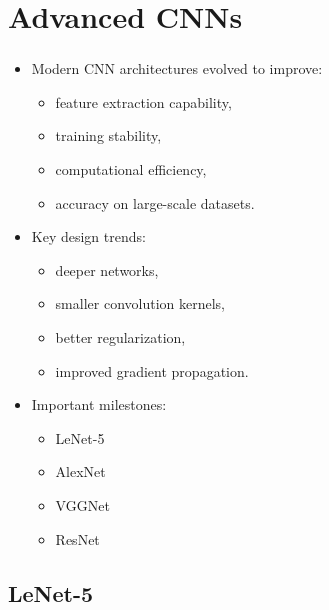 \documentclass[xcolor=table]{beamer}
\begin{document}
\section{Advanced CNNs}

\begin{frame}
	\frametitle{\insertshortsubtitle}
	\framesubtitle{\insertsection}
	
	\begin{itemize}
		
		\item Modern CNN architectures evolved to improve:
		\begin{itemize}
			\item feature extraction capability,
			\item training stability,
			\item computational efficiency,
			\item accuracy on large-scale datasets.
		\end{itemize}
		
		\item Key design trends:
		\begin{itemize}
			\item deeper networks,
			\item smaller convolution kernels,
			\item better regularization,
			\item improved gradient propagation.
		\end{itemize}
		
		\item Important milestones:
		\begin{itemize}
			\item LeNet-5
			\item AlexNet
			\item VGGNet
			\item ResNet
		\end{itemize}
		
	\end{itemize}
	
\end{frame}

\subsection{LeNet-5}
\end{document}
